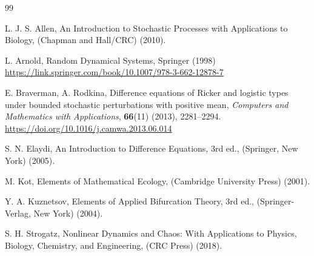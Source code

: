 \documentclass[12pt]{article}
\theoremstyle{definition}
\newcommand{\doilink}[1]{\href{#1}{#1}}
\begin{document}
\begin{thebibliography}{99}

\newblock L. J. S. Allen,
\newblock An Introduction to Stochastic Processes with Applications to Biology,
\newblock (Chapman and Hall/CRC) (2010).

\newblock L. Arnold,
\newblock Random Dynamical Systems,
\newblock Springer (1998)
\doilink{https://link.springer.com/book/10.1007/978-3-662-12878-7}


\newblock E. Braverman, A. Rodkina,
\newblock Difference equations of Ricker and logistic types under bounded stochastic perturbations with positive mean,
\newblock \emph{Computers and Mathematics with Applications}, \textbf{66}(11) (2013), 2281--2294.
\doilink{https://doi.org/10.1016/j.camwa.2013.06.014}

\newblock S. N. Elaydi,
\newblock An Introduction to Difference Equations, 3rd ed.,
\newblock (Springer, New York) (2005).



\newblock M. Kot,
\newblock Elements of Mathematical Ecology,
\newblock (Cambridge University Press) (2001).

\newblock Y. A. Kuznetsov,
\newblock Elements of Applied Bifurcation Theory, 3rd ed.,
\newblock (Springer-Verlag, New York) (2004).

\newblock S. H. Strogatz,
\newblock Nonlinear Dynamics and Chaos: With Applications to Physics, Biology, Chemistry, and Engineering,
\newblock (CRC Press) (2018).


\end{thebibliography}
\end{document}

